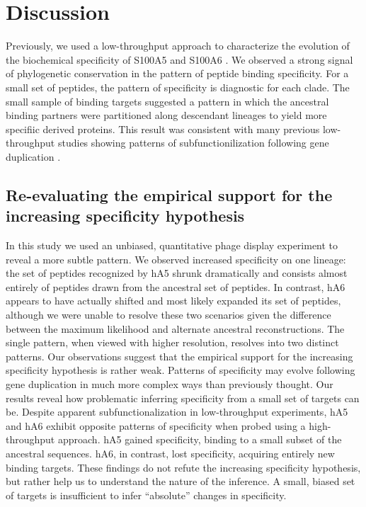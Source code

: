 \section{Discussion}
Previously, we used a low-throughput approach to characterize the
evolution of the biochemical specificity of S100A5 and S100A6 \citep{wheeler_conservation_2017}.
We observed a strong signal of phylogenetic conservation in the pattern
of peptide binding specificity. For a small set of peptides, the pattern
of specificity is diagnostic for each clade. The small sample of binding
targets suggested a pattern in which the ancestral binding partners
were partitioned along descendant lineages to yield more specifiic
derived proteins. This result was consistent with many previous low-throughput
studies showing patterns of subfunctionilization following gene duplication
\citep{carroll_evolution_2008,eick_evolution_2012,risso_hyperstability_2013,pougach_duplication_2014,risso_thermostable_2014,zou_evolution_2015,clifton_ancestral_2016,devamani_catalytic_2016,ma_molecular_2016,rauwerdink_evolution_2016,alhindi_protein_2017,wheeler_conservation_2017}. 

\subsection{Re-evaluating the empirical support for the increasing specificity
hypothesis}

In this study we used an unbiased, quantitative phage display experiment
to reveal a more subtle pattern. We observed increased specificity
on one lineage: the set of peptides recognized by hA5 shrunk dramatically
and consists almost entirely of peptides drawn from the ancestral
set of peptides. In contrast, hA6 appears to have actually shifted
and most likely expanded its set of peptides, although we were unable
to resolve these two scenarios given the difference between the maximum
likelihood and alternate ancestral reconstructions. The single pattern,
when viewed with higher resolution, resolves into two distinct patterns.
Our observations suggest that the empirical support for the increasing
specificity hypothesis is rather weak. Patterns of specificity may
evolve following gene duplication in much more complex ways than previously
thought. Our results reveal how problematic inferring specificity
from a small set of targets can be. Despite apparent subfunctionalization
in low-throughput experiments, hA5 and hA6 exhibit opposite patterns
of specificity when probed using a high-throughput approach. hA5 gained
specificity, binding to a small subset of the ancestral sequences.
hA6, in contrast, lost specificity, acquiring entirely new binding
targets. These findings do not refute the increasing specificity hypothesis,
but rather help us to understand the nature of the inference. A small,
biased set of targets is insufficient to infer ``absolute'' changes
in specificity. 

